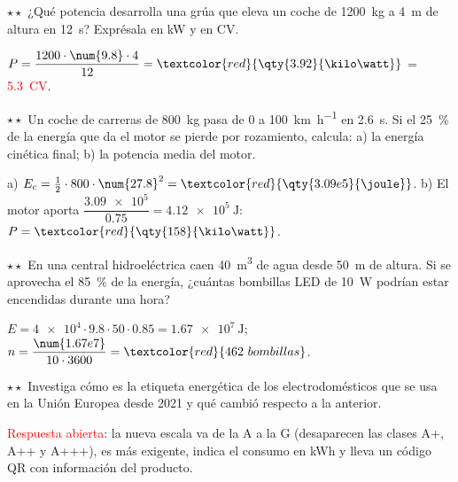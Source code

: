 \begin{exercise}
    \(\star\star\) ¿Qué potencia desarrolla una grúa que eleva un coche de \qty{1200}{\kg} a \qty{4}{\m} de altura en \qty{12}{\s}?
    Exprésala en kW y en CV.
    \begin{solu}
        \(P = \dfrac{1200 \cdot \num{9.8} \cdot 4}{12} = \textcolor{red}{\qty{3.92}{\kilo\watt}}\) = \textcolor{red}{\num{5.3}~CV}.
    \end{solu}
\end{exercise}

\begin{exercise}
    \(\star\star\) Un coche de carreras de \qty{800}{\kg} pasa de 0 a \qty{100}{\km\per\hour} en \qty{2.6}{\s}. Si el \qty{25}{\percent}
    de la energía que da el motor se pierde por rozamiento, calcula: a) la energía cinética final; b) la potencia media del motor.
    \begin{solu}
        a) \(E_c = \frac{1}{2} \cdot 800 \cdot \num{27.8}^2 = \textcolor{red}{\qty{3.09e5}{\joule}}\). b) El motor aporta
        \(\dfrac{\num{3.09e5}}{\num{0.75}} = \qty{4.12e5}{\joule}\): \(P = \textcolor{red}{\qty{158}{\kilo\watt}}\).
    \end{solu}
\end{exercise}

\begin{exercise}
    \(\star\star\) En una central hidroeléctrica caen \qty{40}{\m\cubed} de agua desde \qty{50}{\m} de altura. Si se aprovecha el
    \qty{85}{\percent} de la energía, ¿cuántas bombillas LED de \qty{10}{\watt} podrían estar encendidas durante una hora?
    \begin{solu}
        \(E = \num{4e4} \cdot \num{9.8} \cdot 50 \cdot \num{0.85} = \qty{1.67e7}{\joule}\); \(n = \dfrac{\num{1.67e7}}{10 \cdot 3600} =
        \textcolor{red}{462~bombillas}\).
    \end{solu}
\end{exercise}

\begin{exercise}
    \(\star\star\) Investiga cómo es la etiqueta energética de los electrodomésticos que se usa en la Unión Europea desde 2021 y qué
    cambió respecto a la anterior.
    \begin{solu}
        \textcolor{red}{Respuesta abierta}: la nueva escala va de la A a la G (desaparecen las clases A+, A++ y A+++), es más exigente,
        indica el consumo en kWh y lleva un código QR con información del producto.
    \end{solu}
\end{exercise}

